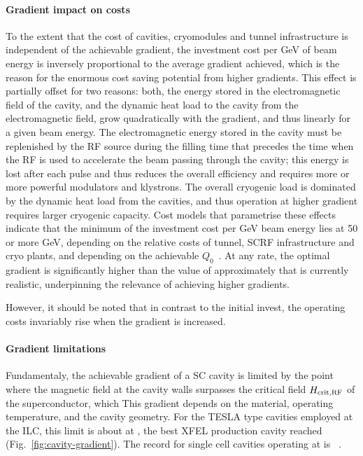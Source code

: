 \paragraph{Gradient impact on costs}
To the extent that the cost of cavities, cryomodules and tunnel infrastructure is independent of the achievable gradient, the investment cost per GeV of beam energy is inversely proportional to the average gradient achieved, which is the reason for the enormous cost saving potential from higher gradients.
This effect is partially offset for two reasons: both, the energy stored in the electromagnetic field of the cavity, and the dynamic heat load to the cavity from the electromagnetic field, grow quadratically with the gradient, and thus linearly for a given beam energy.
The electromagnetic energy stored in the cavity must be replenished by the RF source during the filling time that precedes the time when the RF is used to accelerate the beam passing through the cavity; this energy is lost after each pulse and thus reduces the overall efficiency and requires more or more powerful modulators and klystrons.
The overall cryogenic load is dominated by the dynamic heat load from the cavities, and thus operation at higher gradient requires larger cryogenic capacity.
Cost models that parametrise these effects indicate that the minimum of the investment cost per GeV beam energy lies at \num{50} or more GeV, depending on the relative costs of tunnel, SCRF infrastructure and cryo plants, and depending on the achievable $Q_0$~\cite{Adolphsen:2011a}. 
At any rate, the optimal gradient is significantly higher than the value of approximately  that is currently realistic, underpinning the relevance of achieving higher gradients.

However, it should be noted that in contrast to the initial invest, the operating costs invariably rise when the gradient is increased.

\paragraph{Gradient limitations}

Fundamentaly, the achievable gradient of a SC cavity is limited by the point where the magnetic field at the cavity walls surpasses the critical field $H_{\mathrm{crit,RF}}$ of the superconductor, which 
This gradient depends on the material, operating temperature, and the cavity geometry. 
For the TESLA type cavities employed at the ILC, this limit is about  at ,
the best XFEL production cavity reached  (Fig.~\ref{fig:cavity-gradient}).
The record for single cell cavities operating at  is ~\cite{Eremeev:2007zza}.
%

